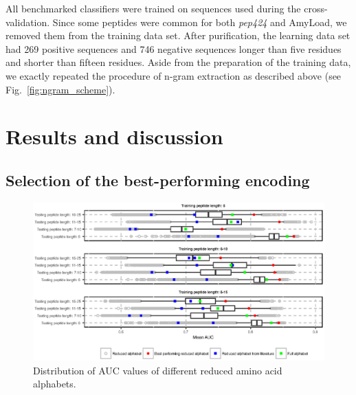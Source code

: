 \documentclass{bioinfo}
\begin{document}
\begin{methods}
  All benchmarked classifiers were trained on sequences used during the 
cross-validation. Since some peptides were common for both \textit{pep424} and 
AmyLoad, we removed them from the training data set. After purification, the 
learning data set had 269 positive sequences and 746 negative sequences longer 
than five residues and shorter than fifteen residues. Aside from the 
preparation of the training data, we exactly repeated the procedure of n-gram 
extraction as described above (see Fig.~\ref{fig:ngram_scheme}). 




\end{methods}

\section{Results and discussion}

\subsection{Selection of the best-performing encoding}

\begin{figure}[!tpb]
\centerline{\includegraphics{figures/AUC_boxplot.eps}}
\caption{Distribution of AUC values of different reduced amino acid alphabets. 
}\label{fig:AUC_boxplot} 
\end{figure}
\end{document}
